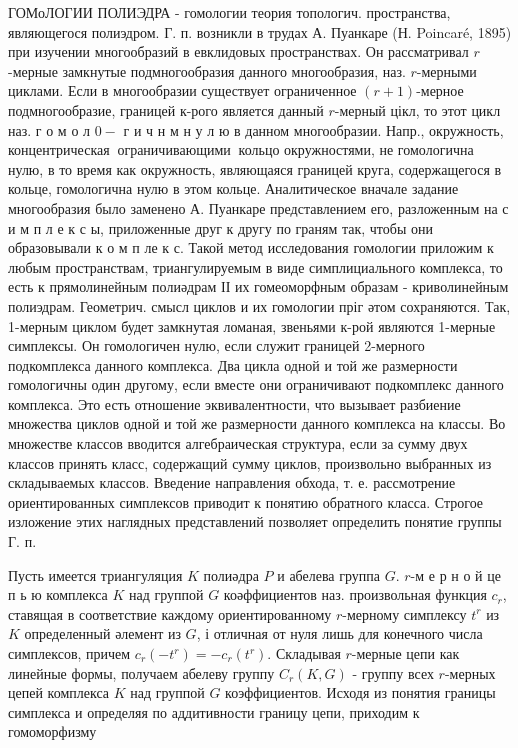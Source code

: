 \documentclass[10pt]{article}
\begin{document}
ГОМоЛОГИИ ПОЛИЭДРА - гомологии теория топологич. пространства, являющегося полиэдром. Г. п. возникли в трудах А. Пуанкаре (Н. Poincaré, 1895) при изучении многообразий в евклидовых пространствах. Он рассматривал $r$-мерные замкнутые подмногообразия данного многообразия, наз. $r$-мерными циклами. Если в многообразии существует ограниченное $(r+1)$-мерное подмногообразие, границей к-рого является данный $r$-мерный цікл, то этот цикл наз. г о м о л $0-$ г и ч н м н у л ю в данном многообразии. Напр., окружность, концентрическая $\mathbf{~ о г р а н и ч и в а ю щ и м и ~}$ кольцо окружностями, не гомологична нулю, в то время как окружность, являющаяся границей круга, содержащегося в кольце, гомологична нулю в этом кольце. Аналитическое вначале задание многообразия было заменено А. Пуанкаре представлением его, разложенным на с и м п л е к с ы, приложенные друг к другу по граням так, чтобы они образовывали к о м п ле к с. Такой метод исследования гомологии приложим к любым пространствам, триангулируемым в виде симплициального комплекса, то есть к прямолинейным полиәдрам ІІ их гомеоморфным образам - криволинейным полиэдрам. Геометрич. смысл циклов и их гомологии пріг әтом сохраняются. Так, 1-мерным циклом будет замкнутая ломаная, звеньями к-рой являются 1-мерные симплексы. Он гомологичен нулю, если служит границей 2-мерного подкомплекса данного комплекса. Два цикла одной и той же размерности гомологичны один другому, если вместе они ограничивают подкомплекс данного комплекса. Это есть отношение эквивалентности, что вызывает разбиение множества циклов одной и той же размерности данного комплекса на классы. Во множестве классов вводится алгебраическая структура, если за сумму двух классов принять класс, содержащий сумму циклов, произвольно выбранных из складываемых классов. Введение направления обхода, т. е. рассмотрение ориентированных симплексов приводит к понятию обратного класса. Строгое изложение этих наглядных представлений позволяет определить понятие группы Г. п.



Пусть имеется триангуляция $K$ полиәдра $P$ и абелева группа $G$. $r$-м е р н о й це п ь ю комплекса $K$ над группой $G$ коәффициентов наз. произвольная функция $c_{r}$, ставящая в соответствие каждому ориентированному $r$-мерному симплексу $t^{r}$ из $K$ определенный әлемент из $G$, і отличная от нуля лишь для конечного числа симплексов, причем $c_{r}\left(-t^{r}\right)=-c_{r}\left(t^{r}\right)$. Складывая $r$-мерные цепи как линейные формы, получаем абелеву группу $C_{r}(K, G)$ - группу всех $r$-мерных цепей комплекса $K$ над группой $G$ коэффициентов. Исходя из понятия границы симплекса и определяя по аддитивности границу цепи, приходим к гомоморфизму
\end{document}
